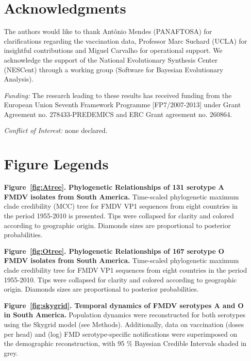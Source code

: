 \documentclass[10pt]{article}
\begin{document}
\section*{Acknowledgments}
The authors would like to thank Ant\^onio Mendes (PANAFTOSA) for clarifications regarding the vaccination data, Professor Marc Suchard (UCLA) for insightful contributions and Miguel Carvalho for operational support.
We acknowledge the support of the National Evolutionary Synthesis Center (NESCent) through a working group (Software for Bayesian Evolutionary Analysis).

\emph{Funding:} The research leading to these results has received funding from the European Union Seventh Framework Programme [FP7/2007-2013] under Grant Agreement no. 278433-PREDEMICS and ERC Grant agreement no. 260864.

\emph{Conflict of Interest:} none declared.

\newpage

\newpage
\section*{Figure Legends}

{\bf Figure~\ref{fig:Atree}. Phylogenetic Relationships of 131 serotype A FMDV isolates from South America.} Time-scaled phylogenetic maximum clade credibility (MCC) tree for FMDV VP1 sequences from eight countries in the period 1955-2010 is presented. Tips were collapsed for clarity and colored according to geographic origin. Diamonds sizes are proportional to posterior probabilities.

{\bf Figure~\ref{fig:Otree}. Phylogenetic Relationships of 167 serotype O FMDV isolates from South America.} Time-scaled phylogenetic maximum clade credibility tree for FMDV VP1 sequences from eight countries in the period 1955-2010. Tips were collapsed for clarity and colored according to geographic origin. Diamonds sizes are proportional to posterior probabilities.

{\bf Figure~\ref{fig:skygrid}. Temporal dynamics of FMDV serotypes A and O in South America.} Population dynamics were reconstructed for both serotypes using the Skygrid model (see Methods). Additionally, data on vaccination  (doses per head) and (log) FMD serotype-specific notifications were superimposed on the demographic reconstruction, with 95 \% Bayesian Credible Intervals shaded in grey.
\end{document}
